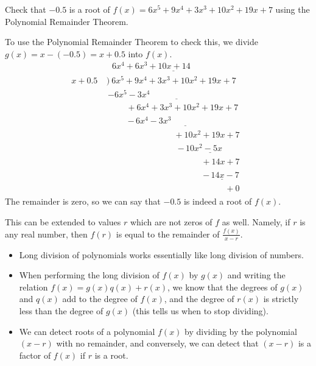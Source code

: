 \documentclass{ximera}
\begin{document}
\begin{example}
Check that $-0.5$ is a root of $f(x) = 6x^5+9x^4+3x^3+10x^2+19x+7$ using the Polynomial Remainder Theorem.
    
\begin{explanation}
    To use the Polynomial Remainder Theorem to check this, we divide $g(x) = x - (-0.5) = x + 0.5$ into $f(x)$.
    \begin{align*}
        & \underline{~~~6x^4+6x^3+10x+14\phantom{somethissom}} \\[-4pt]  x+0.5~&\Big)~6x^5+9x^4+3x^3+10x^2+19x+7 \\[-4pt] 
        &\,\underline{-6x^5-3x^4\phantom{........................................}} \\[-4pt] %
        &\phantom{\Big)}\phantom{.......}+6x^4+3x^3+10x^2+19x+7 \\[-4pt] %
        &\phantom{\Big)\,}\phantom{.......}\underline{-\,6x^4-3x^3\phantom{+10x^2+19x+7....}} \\[-4pt] %
        &\phantom{\Big)\,}\phantom{.......+6x^4+3x^3}+10x^2+19x+7 \\[-4pt] %
        &\phantom{\Big)\,}\phantom{............................}\underline{-\,10x^2-5x\phantom{+7....}} \\[-5pt] %
        &\phantom{\Big)\,}\phantom{.......+6x^4+3x^3+10x^2}+14x+7 \\[-4pt] %
        &\phantom{\Big)\,}\phantom{.......+6x^4+3x^3+10x^2~}\underline{-\,14x-7\ } \\[-4pt] %
        &\phantom{\Big)\,}\phantom{.......+6x^4+3x^3+10x^2+14x}+0 
    \end{align*}
    The remainder is zero, so we can say that $-0.5$ is indeed a root of $f(x)$. 
\end{explanation}
\end{example}

This can be extended to values $r$ which are not zeros of $f$ as well. Namely, if $r$ is any real number, then $f(r)$ is equal to the remainder of $\frac{f(x)}{x-r}$.


\begin{summary}\begin{itemize}
\item Long division of polynomials works essentially like long division of numbers. 
\item When performing the long division of $f(x)$ by $g(x)$ and writing the relation $f(x) = g(x)q(x)+r(x)$, we know that the degrees of $g(x)$ and $q(x)$ add to the degree of $f(x)$, and the degree of $r(x)$ is strictly less than the degree of $g(x)$ (this tells us when to stop dividing).
\item We can detect roots of a polynomial $f(x)$ by dividing by the polynomial $(x-r)$ with no remainder, and conversely, we can detect that $(x-r)$ is a factor of $f(x)$ if $r$ is a root.
\end{itemize}\end{summary}
\end{document}
